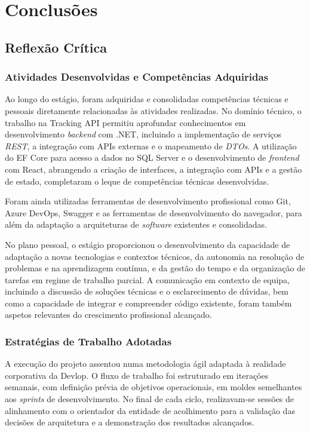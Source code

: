 \documentclass[a4paper,12pt]{report}
\begin{document}
\chapter{Conclusões}

\section{Reflexão Crítica}

\subsection{Atividades Desenvolvidas e Competências Adquiridas}

Ao longo do estágio, foram adquiridas e consolidadas competências técnicas e pessoais diretamente relacionadas às atividades realizadas. No domínio técnico, o trabalho na Tracking API permitiu aprofundar conhecimentos em desenvolvimento \textit{backend} com .NET, incluindo a implementação de serviços \textit{REST}, a integração com APIs externas e o mapeamento de \textit{DTOs}. A utilização do EF Core para acesso a dados no SQL Server e o desenvolvimento de \textit{frontend} com React, abrangendo a criação de interfaces, a integração com APIs e a gestão de estado, completaram o leque de competências técnicas desenvolvidas.

Foram ainda utilizadas ferramentas de desenvolvimento profissional como Git, Azure DevOps, Swagger e as ferramentas de desenvolvimento do navegador, para além da adaptação a arquiteturas de \textit{software} existentes e consolidadas.

No plano pessoal, o estágio proporcionou o desenvolvimento da capacidade de adaptação a novas tecnologias e contextos técnicos, da autonomia na resolução de problemas e na aprendizagem contínua, e da gestão do tempo e da organização de tarefas em regime de trabalho parcial. A comunicação em contexto de equipa, incluindo a discussão de soluções técnicas e o esclarecimento de dúvidas, bem como a capacidade de integrar e compreender código existente, foram também aspetos relevantes do crescimento profissional alcançado.

\subsection{Estratégias de Trabalho Adotadas}

A execução do projeto assentou numa metodologia ágil adaptada à realidade corporativa da Devlop. O fluxo de trabalho foi estruturado em iterações semanais, com definição prévia de objetivos operacionais, em moldes semelhantes aos \textit{sprints} de desenvolvimento. No final de cada ciclo, realizavam-se sessões de alinhamento com o orientador da entidade de acolhimento para a validação das decisões de arquitetura e a demonstração dos resultados alcançados.
\end{document}
